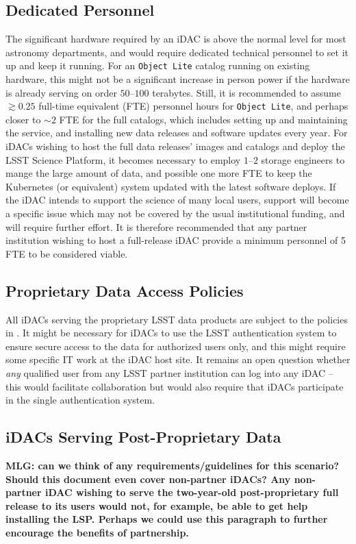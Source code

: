 \subsection{Dedicated Personnel}
The significant hardware required by an iDAC is above the normal level for most astronomy departments, and would require dedicated technical personnel to set it up and keep it running. For an {\tt Object Lite} catalog running on existing hardware, this might not be a significant increase in person power if the hardware is already serving on order $50$--$100$ terabytes. Still, it is recommended to assume $\gtrsim0.25$ full-time equivalent (FTE) personnel hours for {\tt Object Lite}, and perhaps closer to $\sim2$ FTE for the full catalogs, which includes setting up and maintaining the service, and installing new data releases and software updates every year. For iDACs wishing to host the full data releases' images and catalogs and deploy the LSST Science Platform, it becomes necessary to employ $1$--$2$ storage engineers to mange the large amount of data, and possible one more FTE to keep the Kubernetes (or equivalent) system updated with the latest software deploys. If the iDAC intends to support the science of many local users, support will become a specific issue which may not be covered by the usual institutional funding, and will require further effort. It is therefore recommended that any partner institution wishing to host a full-release iDAC provide a minimum personnel of 5 FTE to be considered viable.

\subsection{Proprietary Data Access Policies}
All iDACs serving the proprietary LSST data products are subject to the policies in . It might be necessary for iDACs to use the LSST authentication system to ensure secure access to the data for authorized users only, and this might require some specific IT work at the iDAC host site. It remains an open question whether {\em any} qualified user from any LSST partner institution can log into any iDAC -- this would facilitate collaboration but would also require that iDACs participate in the single authentication system.

\subsection{iDACs Serving Post-Proprietary Data}
{\bf MLG: can we think of any requirements/guidelines for this scenario? Should this document even cover non-partner iDACs? Any non-partner iDAC wishing to serve the two-year-old post-proprietary full release to its users would not, for example, be able to get help installing the LSP. Perhaps we could use this paragraph to further encourage the benefits of partnership.}


